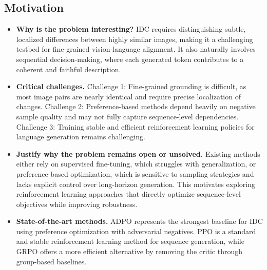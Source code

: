 \documentclass{article}
\begin{document}
\subsection{Motivation}

\begin{itemize}
    \item \textbf{Why is the problem interesting?} IDC requires distinguishing subtle, localized differences between highly similar images, making it a challenging testbed for fine-grained vision-language alignment. It also naturally involves sequential decision-making, where each generated token contributes to a coherent and faithful description.

    \item \textbf{Critical challenges.}
    Challenge 1: Fine-grained grounding is difficult, as most image pairs are nearly identical and require precise localization of changes.
    Challenge 2: Preference-based methods depend heavily on negative sample quality and may not fully capture sequence-level dependencies.
    Challenge 3: Training stable and efficient reinforcement learning policies for language generation remains challenging.

    \item \textbf{Justify why the problem remains open or unsolved.} Existing methods either rely on supervised fine-tuning, which struggles with generalization, or preference-based optimization, which is sensitive to sampling strategies and lacks explicit control over long-horizon generation. This motivates exploring reinforcement learning approaches that directly optimize sequence-level objectives while improving robustness.

    \item \textbf{State-of-the-art methods.} ADPO represents the strongest baseline for IDC using preference optimization with adversarial negatives. PPO is a standard and stable reinforcement learning method for sequence generation, while GRPO offers a more efficient alternative by removing the critic through group-based baselines.
\end{itemize}



\end{document}
